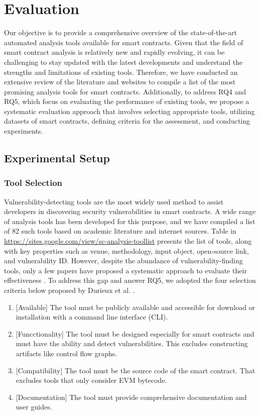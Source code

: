 \documentclass[manuscript,screen]{acmart}
\begin{document}
\section{Evaluation}
\label{evaluation}
Our objective is to provide a comprehensive overview of the state-of-the-art automated analysis tools available for smart contracts. Given that the field of smart contract analysis is relatively new and rapidly evolving, it can be challenging to stay updated with the latest developments and understand the strengths and limitations of existing tools. Therefore, we have conducted an extensive review of the literature and websites to compile a list of the most promising analysis tools for smart contracts. Additionally, to address RQ4 and RQ5, which focus on evaluating the performance of existing tools, we propose a systematic evaluation approach that involves selecting appropriate tools, utilizing datasets of smart contracts, defining criteria for the assessment, and conducting experiments.

\subsection{Experimental Setup}

\subsubsection {Tool Selection} 
Vulnerability-detecting tools are the most widely used method to assist developers in discovering security vulnerabilities in smart contracts. A wide range of analysis tools has been developed for this purpose, and we have compiled a list of 82 such tools based on academic literature and internet sources. Table in \url{https://sites.google.com/view/sc-analysis-toollist} presents the list of tools, along with key properties such as venue, methodology, input object, open-source link, and vulnerability ID. However, despite the abundance of vulnerability-finding tools, only a few papers have proposed a systematic approach to evaluate their effectiveness \cite{GhalebP20,DurieuxFAC20}. To address this gap and answer RQ5, we adopted the four selection criteria below proposed by Durieux et al. \cite{DurieuxFAC20}. 

\begin{enumerate}[C1:]
  \item {[Available]} The tool must be publicly available and accessible for download or installation with a command line interface (CLI).
  \item {[Funcctionality]} The tool must be designed especially for smart contracts and must have the ability and detect vulnerabilities. This excludes constructing artifacts like control flow graphs.
  \item {[Compatibility]} The tool must be the source code of the smart contract. That excludes tools that only consider EVM bytecode.
  \item {[Documentation]} The tool must provide comprehensive documentation and user guides.
\end{enumerate}
\end{document}
